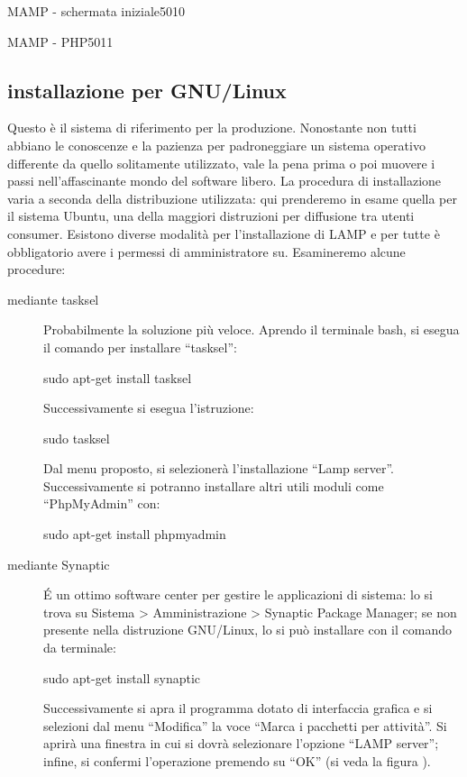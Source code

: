 \begin{img}{MAMP - schermata iniziale}{5}{010}
\end{img}

\begin{img}{MAMP - PHP}{5}{011}
\end{img}

\subsection{installazione per GNU/Linux}
Questo è il sistema di riferimento per la produzione. Nonostante non tutti abbiano le conoscenze e la pazienza per padroneggiare un sistema operativo differente da quello solitamente utilizzato, vale la pena prima o poi muovere i passi nell'affascinante mondo del software libero. La procedura di installazione varia a seconda della distribuzione utilizzata: qui prenderemo in esame quella per il sistema Ubuntu, una della maggiori distruzioni per diffusione tra utenti consumer. Esistono diverse modalità per l'installazione di \ac{LAMP} e per tutte è obbligatorio avere i permessi di amministratore \ac{su}. Esamineremo alcune procedure:

\begin{description}
\item[mediante tasksel] Probabilmente la soluzione più veloce. Aprendo il terminale bash, si esegua il comando per installare ``tasksel'':

\begin{code}
sudo apt-get install tasksel
\end{code}

Successivamente si esegua l'istruzione:

\begin{code}
sudo tasksel
\end{code}

Dal menu proposto, si selezionerà l'installazione ``Lamp server''. Successivamente si potranno installare altri utili moduli come ``PhpMyAdmin'' con:

\begin{code}
sudo apt-get install phpmyadmin
\end{code}

\item[mediante Synaptic] \'E un ottimo software center per gestire le applicazioni di sistema: lo si trova su Sistema > Amministrazione > Synaptic Package Manager; se non presente nella distruzione GNU/Linux, lo si può installare con il comando da terminale:

\begin{code}
sudo apt-get install synaptic
\end{code}

Successivamente si apra il programma dotato di interfaccia grafica e si selezioni dal menu ``Modifica'' la voce ``Marca i pacchetti per attività''. Si aprirà una finestra in cui si dovrà selezionare l'opzione ``LAMP server''; infine, si confermi l'operazione premendo su ``OK'' (si veda la figura ).
\end{description}

